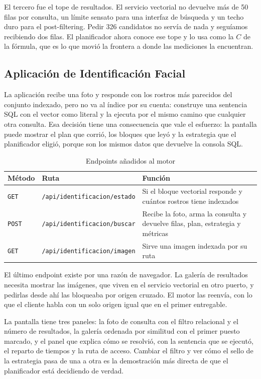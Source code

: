 El tercero fue el tope de resultados. El servicio vectorial no devuelve más de
50 filas por consulta, un límite sensato para una interfaz de búsqueda y un techo
duro para el post-filtering. Pedir 326 candidatos no servía de nada y seguíamos
recibiendo dos filas. El planificador ahora conoce ese tope y lo usa como la $C$
de la fórmula, que es lo que movió la frontera a donde las mediciones la
encuentran.

\subsection{Aplicación de Identificación Facial}

La aplicación recibe una foto y responde con los rostros más parecidos del
conjunto indexado, pero no va al índice por su cuenta: construye una sentencia
SQL con el vector como literal y la ejecuta por el mismo camino que cualquier
otra consulta. Esa decisión tiene una consecuencia que vale el esfuerzo: la
pantalla puede mostrar el plan que corrió, los bloques que leyó y la estrategia
que el planificador eligió, porque son los mismos datos que devuelve la consola
SQL.

\begin{table}[H]
\centering
\caption{Endpoints añadidos al motor}
\begin{tabularx}{\textwidth}{@{}llX@{}}
\toprule
\textbf{Método} & \textbf{Ruta} & \textbf{Función} \\
\midrule
\texttt{GET} & \texttt{/api/identificacion/estado} & Si el bloque vectorial
responde y cuántos rostros tiene indexados \\
\texttt{POST} & \texttt{/api/identificacion/buscar} & Recibe la foto, arma la
consulta y devuelve filas, plan, estrategia y métricas \\
\texttt{GET} & \texttt{/api/identificacion/imagen} & Sirve una imagen indexada
por su ruta \\
\bottomrule
\end{tabularx}
\end{table}

El último endpoint existe por una razón de navegador. La galería de resultados
necesita mostrar las imágenes, que viven en el servicio vectorial en otro
puerto, y pedirlas desde ahí las bloqueaba por origen cruzado. El motor las
reenvía, con lo que el cliente habla con un solo origen igual que en el primer
entregable.

La pantalla tiene tres paneles: la foto de consulta con el filtro relacional y el
número de resultados, la galería ordenada por similitud con el primer puesto
marcado, y el panel que explica cómo se resolvió, con la sentencia que se
ejecutó, el reparto de tiempos y la ruta de acceso. Cambiar el filtro y ver cómo
el sello de la estrategia pasa de una a otra es la demostración más directa de
que el planificador está decidiendo de verdad.

